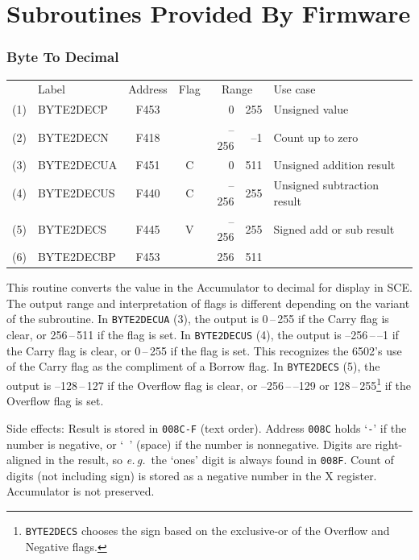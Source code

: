 \documentclass[12pt]{{memoir}}
\newcommand\fwsubroutinehdr[1]{%
\filbreak
\subsubsection{#1}}
\begin{document}
\section{Subroutines Provided By Firmware}

\fwsubroutinehdr{Byte To Decimal}

\begin{center}\begin{tabular}{r>{\ttfamily}l>{\ttfamily}ccr@{\,--\,}rl}
& \textrm{Label} & \textrm{Address} & Flag & \multicolumn{2}{c}{\phantom{--}Range} & Use case \\
(1) & BYTE2DECP & F453 & & 0&255 & Unsigned value \\
(2) & BYTE2DECN & F418 & & --256&--1 & Count up to zero \\
(3) & BYTE2DECUA & F451 & C & 0&511 & Unsigned addition result \\
(4) & BYTE2DECUS & F440 & C & --256&255 & Unsigned subtraction result \\
(5) & BYTE2DECS & F445 & V & --256&255 & Signed add or sub result \\
(6) & BYTE2DECBP & F453 & & 256&511 \\
\end{tabular}\end{center}

This routine converts the value in the Accumulator to decimal for display in SCE. The output range and interpretation of flags is different depending on the variant of the subroutine. In \texttt{BYTE2DECUA} (3), the output is 0\,--\,255 if the Carry flag is clear, or 256\,--\,511 if the flag is set. In \texttt{BYTE2DECUS} (4), the output is --256\,--\,--1 if the Carry flag is clear, or 0\,--\,255 if the flag is set. This recognizes the 6502's use of the Carry flag as the compliment of a Borrow flag. In \texttt{BYTE2DECS} (5), the output is --128\,--\,127 if the Overflow flag is clear, or --256\,--\,--129 or 128\,--\,255\footnote{\texttt{BYTE2DECS} chooses the sign based on the exclusive-or of the Overflow and Negative flags.} if the Overflow flag is set.

Side effects: Result is stored in \texttt{008C-F} (text order). Address \texttt{008C} holds `\texttt{-}' if the number is negative, or `\texttt{ }' (space) if the number is nonnegative. Digits are right-aligned in the result, so \textit{e.\,g.}\ the `ones' digit is always found in \texttt{008F}. Count of digits (not including sign) is stored as a negative number in the X register. Accumulator is not preserved.
\end{document}
